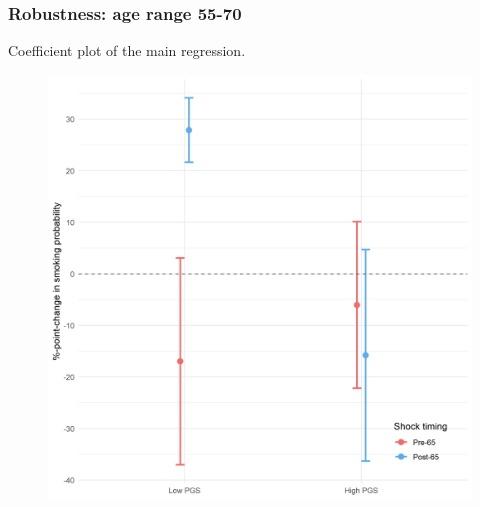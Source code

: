 \documentclass[10pt,compress,xcolor=dvipsnames,aspectratio=169]{beamer}    %
\newcounter{ex}
\newcommand{\1}[1]{\mathrm{1\hspace*{-2.5pt}l}[#1]}	%
\begin{document}
\begin{frame}
\frametitle{Robustness: age range 55-70}
Coefficient plot of the main regression.
\begin{figure}[hbtp]

\centering
\includegraphics[height=0.8\textheight]{../../3_output/shock_effects/robustness_5570_100_cv.png}
\label{fig:coeffplot55-70}
\end{figure}
\hyperlink{frame:robustness}{}
\end{frame}


%
%
%
\end{document}
